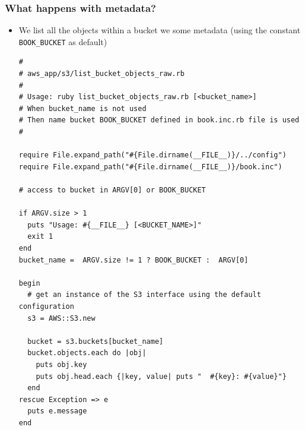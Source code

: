 \documentclass{beamer}
\begin{document}
\begin{frame}
\frametitle{What happens with metadata?}
\begin{itemize}
 \item We list all the objects within a bucket we some metadata (using the constant \texttt{BOOK\_BUCKET} as default)

\lstset{language=Ruby, style=eclipse}
\begin{lstlisting}
#
# aws_app/s3/list_bucket_objects_raw.rb
#
# Usage: ruby list_bucket_objects_raw.rb [<bucket_name>]
# When bucket_name is not used
# Then name bucket BOOK_BUCKET defined in book.inc.rb file is used
#

require File.expand_path("#{File.dirname(__FILE__)}/../config")
require File.expand_path("#{File.dirname(__FILE__)}/book.inc")

# access to bucket in ARGV[0] or BOOK_BUCKET

if ARGV.size > 1
  puts "Usage: #{__FILE__} [<BUCKET_NAME>]"
  exit 1
end
bucket_name =  ARGV.size != 1 ? BOOK_BUCKET :  ARGV[0]

begin
  # get an instance of the S3 interface using the default configuration
  s3 = AWS::S3.new

  bucket = s3.buckets[bucket_name]
  bucket.objects.each do |obj|
    puts obj.key
    puts obj.head.each {|key, value| puts "  #{key}: #{value}"}
  end
rescue Exception => e
  puts e.message
end
\end{lstlisting}
\end{itemize}

\end{frame}
\end{document}
